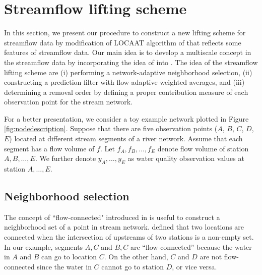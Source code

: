 \documentclass[11pt,titlepage]{article}
\begin{document}
\section{Streamflow lifting scheme}\label{sec:streamflowliftingscheme}

In this section, we present our procedure to construct a new lifting scheme for streamflow data by modification of LOCAAT algorithm of  \citet{Jansen2009} that reflects some features of streamflow data. 
Our main idea is to develop a multiscale concept in the streamflow data by incorporating the idea of \cite{Nunes2006} into \cite{ODonnell2014}.
The idea of the streamflow lifting scheme are (i) performing a network-adaptive neighborhood selection, (ii) constructing a prediction filter with flow-adaptive weighted averages, and (iii) determining a removal order by defining a proper contribution measure of each observation point for the stream network.

For a better presentation, we consider a toy example network plotted in Figure \ref{fig:nodedescription}. Suppose that there are five observation points ($A$, $B$, $C$, $D$, $E$) located at different stream segments of a river network. Assume that each segment has a flow volume of $f$. Let $f_A, f_B, \ldots, f_E$ denote flow volume of station $A, B,\ldots, E$. We further denote $y_A, \ldots, y_E$ as water quality observation values at station $A,\ldots, E$.


\subsection{Neighborhood selection}\label{subsec:nbd}




%

The concept of ``flow-connected" introduced in \cite{VerHoef(2006)} is useful to construct a neighborhood set of a point in stream network. %
\cite{VerHoef(2006)} defined that two locations are connected when the intersection of upstreams of two stations is a non-empty set. In our example, segments $A, C$ and $B, C$ are ``flow-connected'' because the water in $A$ and $B$ can go to location $C$. On the other hand, $C$ and $D$ are not flow-connected since the water in $C$ cannot go to station $D$, or vice versa. 
\end{document}

